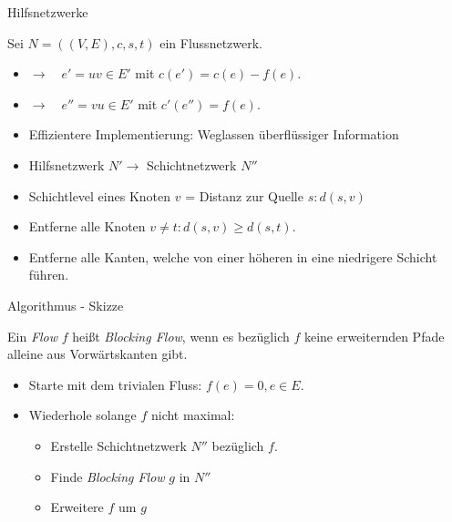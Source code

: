 \documentclass[aspectratio=169]{beamer}
\begin{document}
\begin{frame}{Hilfsnetzwerke}

  Sei $N = ((V,E), c, s, t)$ ein Flussnetzwerk.

  \begin{definition}[Hilfsnetzwerk $N' = ((V,E'), c', s, t)$]  
  
    \begin{itemize}
      \item{ $\rightarrow \quad e' = uv \in E'$ mit $c(e') = c(e) - f(e)$.}
      \item{ $\rightarrow \quad e'' = vu \in E'$ mit $c'(e'') = f(e)$.}
    \end{itemize}
  \end{definition}

  \begin{itemize}
    \item Effizientere Implementierung: Weglassen überflüssiger Information
    \item Hilfsnetzwerk $N' \rightarrow$ Schichtnetzwerk $N''$
    \item Schichtlevel eines Knoten $v$ = Distanz zur Quelle $s: d(s,v)$
    \item Entferne alle Knoten $v \neq t: d(s,v) \geq d(s,t)$.
    \item Entferne alle Kanten, welche von einer höheren in eine niedrigere Schicht führen.
  \end{itemize}

\end{frame}


\begin{frame}{Algorithmus - Skizze}

  \begin{definition}
    Ein \textit{Flow} $f$ heißt \textit{Blocking Flow}, wenn
    es bezüglich $f$ keine erweiternden Pfade alleine aus
    Vorwärtskanten gibt.
  \end{definition}
  
  \begin{algorithmus*}
    \begin{itemize}
      \item Starte mit dem trivialen Fluss: $f(e) = 0 , e \in E$.
      \item Wiederhole solange $f$ nicht maximal:
      \begin{itemize}
        \item Erstelle Schichtnetzwerk $N''$ bezüglich $f$.
        \item Finde \textit{Blocking Flow} $g$ in $N''$
        \item Erweitere $f$ um $g$
      \end{itemize}
    \end{itemize}
  \end{algorithmus*}

\end{frame}
\end{document}
